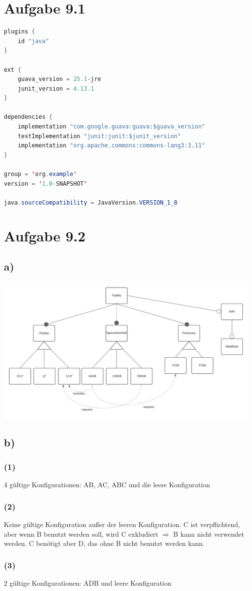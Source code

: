\documentclass[a4paper,11pt]{scrartcl}
\begin{document}
		
	\section*{Aufgabe 9.1}
	\begin{lstlisting}[language=Java]
plugins {
    id "java"    
}
        
ext {
    guava_version = 25.1-jre
    junit_version = 4.13.1
}
    
dependencies {
    implementation "com.google.guava:guava:$guava_version"
    testImplementation "junit:junit:$junit_version"
    implementation "org.apache.commons:commons-lang3:3.11"
}
        
group = 'org.example'
version = '1.0-SNAPSHOT' 
        
java.sourceCompatibility = JavaVersion.VERSION_1_8
    \end{lstlisting}
	
	\section*{Aufgabe 9.2}
	\subsection*{a)}
	    \includegraphics[scale=0.6]{src/09_2_Featurediagram.pdf}
	\subsection*{b)}
	    \subsubsection*{(1)}
	        4 gültige Konfigurationen: AB, AC, ABC und die leere Konfiguration
	    \subsubsection*{(2)}
	        Keine gültige Konfiguration außer der leeren Konfiguration. C ist verpflichtend, aber wenn B benutzt werden soll, wird C exkludiert $\Rightarrow$ B kann nicht verwendet werden. C benötigt aber D, das ohne B nicht benutzt werden kann. 
	    \subsubsection*{(3)}
	        2 gültige Konfigurationen: ADB und leere Konfiguration
\end{document}
